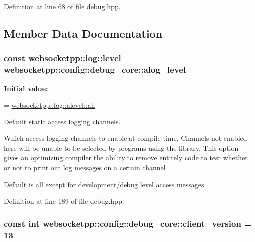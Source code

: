 Definition at line 68 of file debug.\+hpp.



\subsection{Member Data Documentation}
\subsubsection[{\texorpdfstring{alog\+\_\+level}{alog\_level}}]{\setlength{\rightskip}{0pt plus 5cm}const websocketpp\+::log\+::level websocketpp\+::config\+::debug\+\_\+core\+::alog\+\_\+level\hspace{0.3cm}{\ttfamily [static]}}\hypertarget{structwebsocketpp_1_1config_1_1debug__core_afed6fcfe2f8950b959713c7459e3645c}{}\label{structwebsocketpp_1_1config_1_1debug__core_afed6fcfe2f8950b959713c7459e3645c}
{\bfseries Initial value\+:}
\begin{DoxyCode}
=
        \hyperlink{structwebsocketpp_1_1log_1_1alevel_a853aa0b8976e53f3181af3bc398d493e}{websocketpp::log::alevel::all}
\end{DoxyCode}


Default static access logging channels. 

Which access logging channels to enable at compile time. Channels not enabled here will be unable to be selected by programs using the library. This option gives an optimizing compiler the ability to remove entirely code to test whether or not to print out log messages on a certain channel

Default is all except for development/debug level access messages 

Definition at line 189 of file debug.\+hpp.

\subsubsection[{\texorpdfstring{client\+\_\+version}{client\_version}}]{\setlength{\rightskip}{0pt plus 5cm}const int websocketpp\+::config\+::debug\+\_\+core\+::client\+\_\+version = 13\hspace{0.3cm}{\ttfamily [static]}}\hypertarget{structwebsocketpp_1_1config_1_1debug__core_a2749c03e9600b76c6ee5c1184919f2f7}{}\label{structwebsocketpp_1_1config_1_1debug__core_a2749c03e9600b76c6ee5c1184919f2f7}


